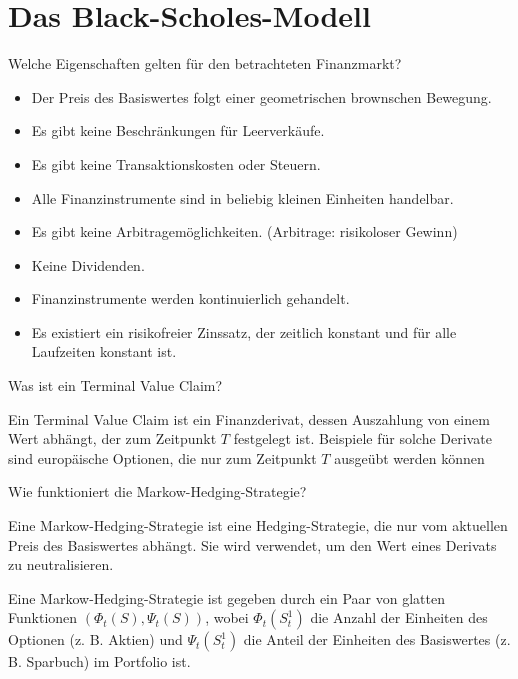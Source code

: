 \newpage
\section*{Das Black-Scholes-Modell}

\begin{QandA}
    \item Welche Eigenschaften gelten für den betrachteten Finanzmarkt?
    \begin{answered}
        \begin{itemize}
            \item Der Preis des Basiswertes folgt einer geometrischen brownschen Bewegung.
            \item Es gibt keine Beschränkungen für Leerverkäufe.
            \item Es gibt keine Transaktionskosten oder Steuern.
            \item Alle Finanzinstrumente sind in beliebig kleinen Einheiten handelbar.
            \item Es gibt keine Arbitragemöglichkeiten. (Arbitrage: risikoloser Gewinn)
            \item Keine Dividenden.
            \item Finanzinstrumente werden kontinuierlich gehandelt.
            \item Es existiert ein risikofreier Zinssatz, der zeitlich konstant und für alle Laufzeiten konstant ist.
        \end{itemize}
    \end{answered}

    \item Was ist ein Terminal Value Claim?
    \begin{answered}
        Ein Terminal Value Claim ist ein Finanzderivat, dessen Auszahlung von einem Wert abhängt, der zum Zeitpunkt $T$ festgelegt ist.
        Beispiele für solche Derivate sind europäische Optionen, die nur zum Zeitpunkt $T$ ausgeübt werden können
    \end{answered}

    \item Wie funktioniert die Markow-Hedging-Strategie?
    \begin{answered}
        Eine Markow-Hedging-Strategie ist eine Hedging-Strategie, die nur vom aktuellen Preis des Basiswertes abhängt.
        Sie wird verwendet, um den Wert eines Derivats zu neutralisieren.

        Eine Markow-Hedging-Strategie ist gegeben durch ein Paar von glatten Funktionen $(\Phi_t(S), \Psi_t(S))$, wobei $\Phi_t(S_t^1)$ die Anzahl der Einheiten des Optionen (z. B. Aktien) und $\Psi_t(S_t^1)$ die Anteil der Einheiten des Basiswertes (z. B. Sparbuch) im Portfolio ist.


\end{answered}
\end{QandA}
